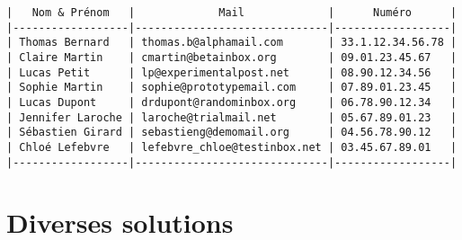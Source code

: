 \begin{verbatim}
|   Nom & Prénom   |             Mail             |      Numéro      |
|------------------|------------------------------|------------------|
| Thomas Bernard   | thomas.b@alphamail.com       | 33.1.12.34.56.78 |
| Claire Martin    | cmartin@betainbox.org        | 09.01.23.45.67   |
| Lucas Petit      | lp@experimentalpost.net      | 08.90.12.34.56   |
| Sophie Martin    | sophie@prototypemail.com     | 07.89.01.23.45   |
| Lucas Dupont     | drdupont@randominbox.org     | 06.78.90.12.34   |
| Jennifer Laroche | laroche@trialmail.net        | 05.67.89.01.23   |
| Sébastien Girard | sebastieng@demomail.org      | 04.56.78.90.12   |
| Chloé Lefebvre   | lefebvre_chloe@testinbox.net | 03.45.67.89.01   |
|------------------|------------------------------|------------------|
\end{verbatim}
\medskip

\section{Diverses solutions}
